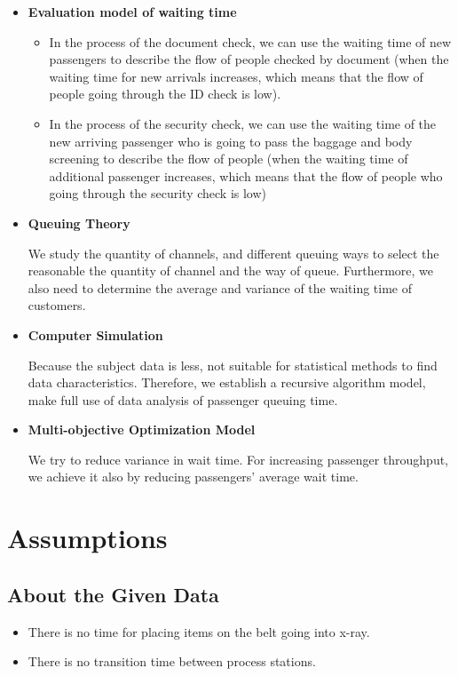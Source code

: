 \documentclass{mcmthesis}
\begin{document}
\begin{itemize}
	\item \textbf{Evaluation model of waiting time}
	\begin{itemize}
		\item \par In the process of the document check, we can use the waiting time of new passengers to describe the flow of people checked by document (when the waiting time for new arrivals increases, which means that the flow of people going through the ID check is low).
		\item \par In the process of the security check, we can use the waiting time of the new arriving passenger who is going to pass the baggage and body screening to describe the flow of people (when the waiting time of additional passenger increases, which means that the flow of people who going through the security check is low)
	\end{itemize}
	\item \textbf{Queuing Theory}
	\par We study the quantity of channels, and different queuing ways to select the reasonable the quantity of channel and the way of queue. Furthermore, we also need to determine the average and variance of the waiting time of customers.
	\item \textbf{Computer Simulation}
	\par Because the subject data is less, not suitable for statistical methods to find data characteristics. Therefore, we establish a recursive algorithm model, make full use of data analysis of passenger queuing time.
	\item \textbf{Multi-objective Optimization Model}
	\par We try to reduce variance in wait time. For increasing passenger throughput, we achieve it also by reducing passengers' average wait time. 
	\par 

	
		
\end{itemize}


\section{Assumptions}

\subsection{About the Given Data}
\begin{itemize}
	\item There is no time for placing items on the belt going into x-ray.
	\item There is no transition time between process stations.
\end{itemize}
\end{document}
